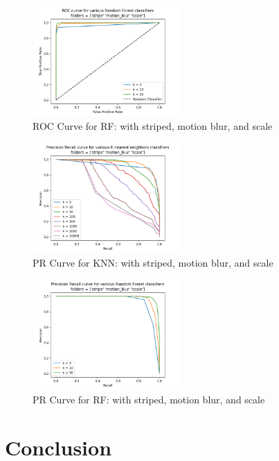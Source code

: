 \begin{figure}[htbp]
    \centerline{\includegraphics[width=0.5\textwidth]{resources/roc_curve_rf_stripe_motion_blur_scale.png}}    
    \caption{ROC Curve for RF: with striped, motion blur, and scale}\label{fig18}
\end{figure}

\begin{figure}[htbp]
    \centerline{\includegraphics[width=0.5\textwidth]{resources/precision_recall_knn_stripe_motion_blur_scale.png}}    
    \caption{PR Curve for KNN: with striped, motion blur, and scale}\label{fig19}
\end{figure}

\begin{figure}[htbp]
    \centerline{\includegraphics[width=0.5\textwidth]{resources/precision_recall_rf_stripe_motion_blur_scale.png}}    
    \caption{PR Curve for RF: with striped, motion blur, and scale}\label{fig20}
\end{figure}

\section{Conclusion}

